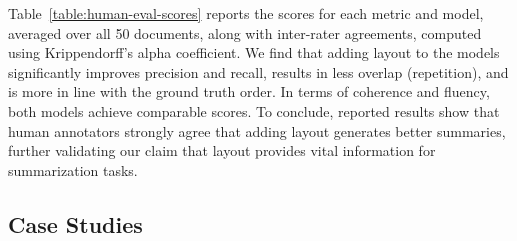 Table~\ref{table:human-eval-scores} reports the scores for each metric and model, averaged over all 50 documents, along with inter-rater agreements, computed using Krippendorff's alpha coefficient. We find that adding layout to the models significantly improves precision and recall, results in less overlap (repetition), and is more in line with the ground truth order. In terms of coherence and fluency, both models achieve comparable scores. To conclude, reported results show that human annotators strongly agree that adding layout generates better summaries, further validating our claim that layout provides vital information for summarization tasks.

\subsection{Case Studies}

